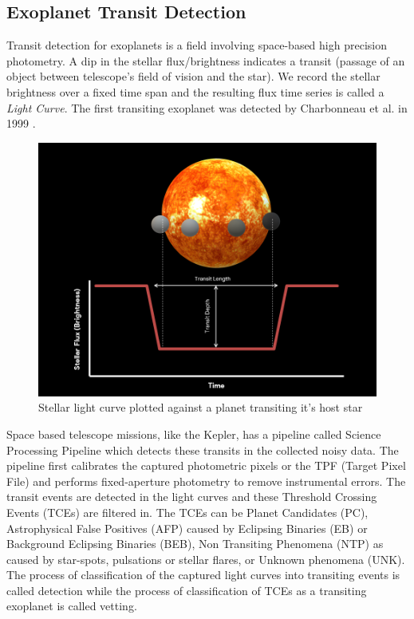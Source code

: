 \subsection{Exoplanet Transit Detection}
Transit detection for exoplanets is a field involving space-based high precision photometry. A dip in the stellar flux/brightness indicates a transit (passage of an object between telescope's field of vision and the star). We record the stellar brightness over a fixed time span and the resulting flux time series is called a \emph{Light Curve}. The first transiting exoplanet was detected by Charbonneau et al. in 1999 \cite{char}. \\
\begin{figure}[h]
    \centering
    \includegraphics[scale=0.3]{Images/Transit.png}
    \caption{Stellar light curve plotted against a planet transiting it's host star}
    \label{fig:Transit}
\end{figure}

Space based telescope missions, like the Kepler, has a pipeline called Science Processing Pipeline \cite{2dcnn} which detects these transits in the collected noisy data. The pipeline first calibrates the captured photometric pixels or the TPF (Target Pixel File) and performs fixed-aperture photometry to remove instrumental errors. The transit events are detected in the light curves and these Threshold Crossing Events (TCEs) are filtered in. The TCEs can be Planet Candidates (PC), Astrophysical False Positives (AFP) caused by Eclipsing Binaries (EB) or Background Eclipsing Binaries (BEB), Non Transiting Phenomena (NTP) as caused by star-spots, pulsations or stellar flares, or Unknown phenomena (UNK). The process of classification of the captured light curves into transiting events is called detection while the process of classification of TCEs as a transiting exoplanet is called vetting.\\

